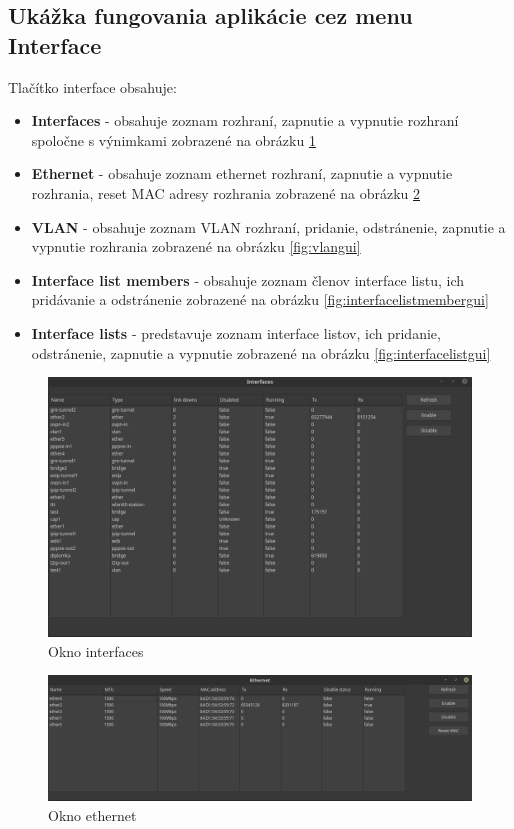 \subsection{Ukážka fungovania aplikácie cez menu Interface}
\label{sec:gui}
Tlačítko interface obsahuje:
\begin{itemize}
\item \textbf{Interfaces} - obsahuje zoznam rozhraní, zapnutie a vypnutie rozhraní spoločne s výnimkami zobrazené na obrázku \ref{fig:interfacesgui} 
\item \textbf{Ethernet} - obsahuje zoznam ethernet rozhraní, zapnutie a vypnutie rozhrania, reset MAC adresy rozhrania zobrazené na obrázku \ref{fig:ethernet}
\item \textbf{VLAN} - obsahuje zoznam VLAN rozhraní, pridanie, odstránenie, zapnutie a vypnutie rozhrania zobrazené na obrázku \ref{fig:vlangui}
\item \textbf{Interface list members} - obsahuje zoznam členov interface listu, ich pridávanie a odstránenie zobrazené na obrázku \ref{fig:interfacelistmembergui}
\item \textbf{Interface lists} - predstavuje zoznam interface listov, ich pridanie, odstránenie, zapnutie a vypnutie zobrazené na obrázku \ref{fig:interfacelistgui}
\end{itemize}
\begin{figure}[H]
\centering
\includegraphics[scale=0.35]{../text/interfacesgui.png}
\caption{Okno interfaces}
\label{fig:interfacesgui}
\end{figure}
\begin{figure}[H]
\centering
\includegraphics[scale=0.35]{../text/ethernet.png}
\caption{Okno ethernet}
\label{fig:ethernet}
\end{figure}
